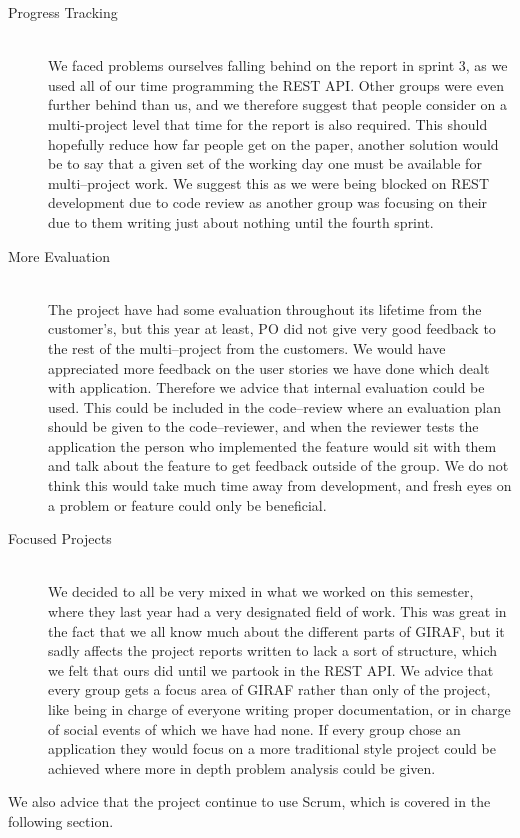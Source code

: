 \begin{description}
	\item[Progress Tracking] \hfill \\
	We faced problems ourselves falling behind on the report in sprint 3, as we used all of our time programming the REST API.
	Other groups were even further behind than us, and we therefore suggest that people consider on a multi-project level that time for the report is also required.
	This should hopefully reduce how far people get on the paper, another solution would be to say that a given set of the working day one must be available for multi--project work.
	We suggest this as we were being blocked on REST development due to code review as another group was focusing on their due to them writing just about nothing until the fourth sprint.

	\item[More Evaluation] \hfill \\
	The project have had some evaluation throughout its lifetime from the customer's, but this year at least, PO did not give very good feedback to the rest of the multi--project from the customers.
	We would have appreciated more feedback on the user stories we have done which dealt with application.
	Therefore we advice that internal evaluation could be used.
	This could be included in the code--review where an evaluation plan should be given to the code--reviewer, and when the reviewer tests the application the person who implemented the feature would sit with them and talk about the feature to get feedback outside of the group.
	We do not think this would take much time away from development, and fresh eyes on a problem or feature could only be beneficial.

	\item[Focused Projects] \hfill \\
	We decided to all be very mixed in what we worked on this semester, where they last year had a very designated field of work.
	This was great in the fact that we all know much about the different parts of GIRAF, but it sadly affects the project reports written to lack a sort of structure, which we felt that ours did until we partook in the REST API.
	We advice that every group gets a focus area of GIRAF rather than only of the project, like being in charge of everyone writing proper documentation, or in charge of social events of which we have had none.
	If every group chose an application they would focus on a more traditional style project could be achieved where more in depth problem analysis could be given.
\end{description}
We also advice that the project continue to use Scrum, which is covered in the following section.

